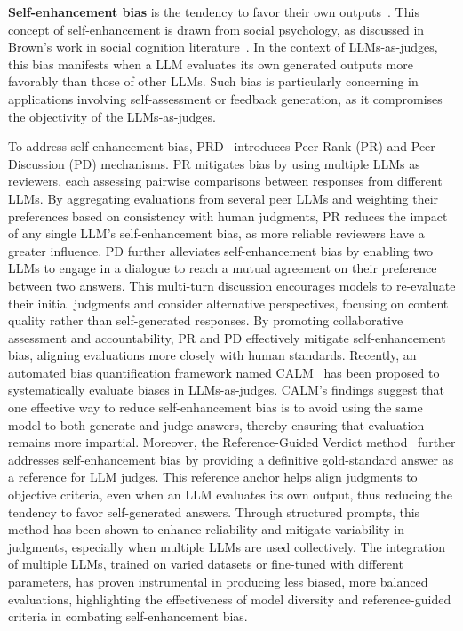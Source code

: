 \noindent\textbf{Self-enhancement bias} is the tendency to favor their own outputs~\cite{liu2023g,zheng2023judging,li2023prd,liu2023g,panickssery2024llm}. 
This concept of self-enhancement is drawn from social psychology, as discussed in Brown’s work in social cognition literature~\cite{brown1986evaluations}.
In the context of LLMs-as-judges, this bias manifests when a LLM evaluates its own generated outputs more favorably than those of other LLMs. Such bias is particularly concerning in applications involving self-assessment or feedback generation, as it compromises the objectivity of the LLMs-as-judges.

To address self-enhancement bias, PRD~\cite{li2023prd} introduces Peer Rank (PR) and Peer Discussion (PD) mechanisms. PR mitigates bias by using multiple LLMs as reviewers, each assessing pairwise comparisons between responses from different LLMs. By aggregating evaluations from several peer LLMs and weighting their preferences based on consistency with human judgments, PR reduces the impact of any single LLM’s self-enhancement bias, as more reliable reviewers have a greater influence. PD further alleviates self-enhancement bias by enabling two LLMs to engage in a dialogue to reach a mutual agreement on their preference between two answers. This multi-turn discussion encourages models to re-evaluate their initial judgments and consider alternative perspectives, focusing on content quality rather than self-generated responses. By promoting collaborative assessment and accountability, PR and PD effectively mitigate self-enhancement bias, aligning evaluations more closely with human standards.
Recently, an automated bias quantification framework named CALM~\cite{ye2024justice} has been proposed to systematically evaluate biases in LLMs-as-judges. CALM’s findings suggest that one effective way to reduce self-enhancement bias is to avoid using the same model to both generate and judge answers, thereby ensuring that evaluation remains more impartial.
Moreover, the Reference-Guided Verdict method~\cite{badshah2024reference} further addresses self-enhancement bias by providing a definitive gold-standard answer as a reference for LLM judges. This reference anchor helps align judgments to objective criteria, even when an LLM evaluates its own output, thus reducing the tendency to favor self-generated answers. Through structured prompts, this method has been shown to enhance reliability and mitigate variability in judgments, especially when multiple LLMs are used collectively. The integration of multiple LLMs, trained on varied datasets or fine-tuned with different parameters, has proven instrumental in producing less biased, more balanced evaluations, highlighting the effectiveness of model diversity and reference-guided criteria in combating self-enhancement bias.

